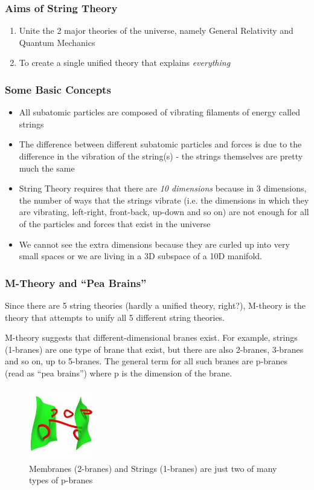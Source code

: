 \documentclass{beamer}
\begin{document}
\begin{frame}
\frametitle{Aims of String Theory}
\begin{enumerate}
\item Unite the 2 major theories of the universe, namely General Relativity and Quantum Mechanics
\item To create a single unified theory that explains \emph{everything}
\end{enumerate}
\end{frame}

\begin{frame}
\frametitle{Some Basic Concepts}
\begin{itemize}
\item All subatomic particles are composed of vibrating filaments of energy called strings
\item The difference between different subatomic particles and forces is due to the difference in the vibration of the string(s) - the strings themselves are pretty much the same
\item String Theory requires that there are \emph{10 dimensions} because in 3 dimensions, the number of ways that the strings vibrate (i.e. the dimensions in which they are vibrating, left-right, front-back, up-down and so on) are not enough for all of the particles and forces that exist in the universe
\item We cannot see the extra dimensions because they are curled up into very small spaces or we are living in a 3D subspace of a 10D manifold.
\end{itemize}
\end{frame}

\begin{frame}
\frametitle{M-Theory and ``Pea Brains''}

Since there are 5 string theories (hardly a unified theory, right?), M-theory is the theory that attempts to unify all 5 different string theories.

M-theory suggests that different-dimensional branes exist. For example, strings (1-branes) are one type of brane that exist, but there are also 2-branes, 3-branes and so on, up to 5-branes. The general term for all such branes are p-branes (read as ``pea brains'') where p is the dimension of the brane.

\begin{figure}
\centering
\includegraphics[width=0.25\textwidth]{p-branes.jpg}
\caption{\label{fig:branes}Membranes (2-branes) and Strings (1-branes) are just two of many types of p-branes}
\end{figure}

\end{frame}
\end{document}
